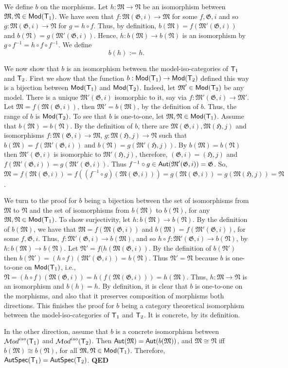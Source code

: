 \documentclass[12pt,leqno]{article}
\newcommand{\de}{\mbox{\ :=\ }}
\newcommand{\Mm}{\mbox{$\mathfrak M$}}
\newcommand{\Nn}{\mbox{$\mathfrak N$}}
\newcommand{\Gg}{\mbox{$\mathfrak G$}}
\newcommand{\Hh}{\mbox{$\mathfrak H$}}
\newcommand{\Aut}{\mbox{\sf Aut}}
\newcommand{\AutSpec}{\mbox{\sf AutSpec}}
\newcommand{\T}{\mbox{\sf T}}
\newcommand{\Mod}{\mbox{\sf Mod}}
\newcommand{\Cat}{\mbox{$\mathcal Mod$}}
\newcommand{\qed}{\hfill\mbox{\bf QED}\bigskip}
\begin{document}
We define $b$ on the morphisms. Let $h:\Mm\to\Nn$ be an isomorphism between $\Mm,\Nn\in\Mod(\T_1)$. We have seen that $f:\Mm(\Gg,i)\to\Mm$ for some $f,\Gg,i$ and so $g:\Mm(\Gg,i)\to\Nn$ for $g=h\circ f$. Thus, by definition, $b(\Mm)=f(\Mm'(\Gg,i))$ and $b(\Nn)=g(\Mm'(\Gg,i))$. Hence, $h:b(\Mm)\to b(\Nn)$ is an isomorphism by $g\circ f^{-1}=h\circ f\circ f^{-1}$. We define
\[ b(h) \de h .\] 

We now show that $b$ is an isomorphism between the model-iso-categories of $\T_1$ and $\T_2$.
%
First we show that the function $b:\Mod(\T_1)\to\Mod(\T_2)$ defined this way is a bijection between $\Mod(\T_1)$ and $\Mod(\T_2)$. Indeed, let $\Mm'\in\Mod(\T_2)$ be any model. There is a unique $\Mm'(\Gg,i)$ isomorphic to it, say via $f:\Mm'(\Gg,i)\to\Mm'$. Let $\Mm=f(\Mm(\Gg,i))$, then $\Mm'=b(\Mm)$, by the definition of $b$. Thus, the range of $b$ is $\Mod(\T_2)$. To see that $b$ is one-to-one, let $\Mm,\Nn\in\Mod(\T_1)$. Assume that $b(\Mm)=b(\Nn)$. By the definition of $b$, there are $\Mm(\Gg,i), \Mm(\Hh,j)$ and isomorphisms $f:\Mm(\Gg,i)\to \Mm$, $g:\Mm(\Hh,j)\to\Nn$ such that  $b(\Mm)=f(\Mm'(\Gg,i))$ and $b(\Nn)=g(\Mm'(\Hh,j))$. By $b(\Mm)=b(\Nn)$ then $\Mm'(\Gg,i)$ is isomorphic to $\Mm'(\Hh,j)$,  therefore, $(\Gg,i)=(\Hh,j)$ and  $f(\Mm'(\Gg,i))=g(\Mm'(\Gg,i))$. Thus $f^{-1}\circ g\in\Aut(\Mm'(\Gg,i))=\Gg$. So,  $\Mm=f(\Mm(\Gg,i))=f((f^{-1}\circ g)(\Mm(\Gg,i)))=g(\Mm(\Gg,i))=g(\Mm(\Hh,j))=\Nn$. 

We turn to the proof for $b$ being a bijection between the set of isomorphisms from $\Mm$ to $\Nn$ and the set of isomorphisms from $b(\Mm)$ to $b(\Nn)$, for any $\Mm,\Nn\in\Mod(\T_1)$. To show surjectivity, let $h:b(\Mm)\to b(\Nn)$. By the definition of $b(\Mm)$, we have that $\Mm=f(\Mm(\Gg,i))$ and $b(\Mm)=f(\Mm'(\Gg,i))$, for some $f,\Gg,i$. Thus, $f:\Mm'(\Gg,i)\to b(\Mm)$, and so $h\circ f:\Mm'(\Gg,i)\to b(\Nn)$, by $h:b(\Mm)\to b(\Nn)$. Let $\Nn'=f(h(\Mm(\Gg,i))$. By the definition of $b(\Nn')$ then  $b(\Nn')=(h\circ f)(\Mm'(\Gg,i))=b(\Nn)$. Thus $\Nn'=\Nn$ because $b$ is one-to-one on $\Mod(\T_1)$, i.e., $\Nn=(h\circ f)(\Mm(\Gg,i))=h(f(\Mm(\Gg,i)))=h(\Mm)$. Thus, $h:\Mm\to\Nn$ is an isomorphism and $b(h)=h$. By definition, it is  clear that $b$ is one-to-one on the morphisms, and also that it preserves composition of morphisms both directions. This finishes the proof for $b$ being a category theoretical isomorphism between the model-iso-categories of $\T_1$ and $\T_2$. It is concrete, by its definition.

In the other direction, assume that $b$ is a concrete isomorphism between $\Cat^{iso}(\T_1)$ and $\Cat^{iso}(\T_2)$. Then $\Aut(\Mm)=\Aut(b(\Mm))$, and $\Mm\cong\Nn$ iff $b(\Mm)\cong b(\Nn)$, for all $\Mm,\Nn\in\Mod(\T_1)$. Therefore, $\AutSpec(\T_1)=\AutSpec(\T_2)$. %
\qed\bigskip
\end{document}
